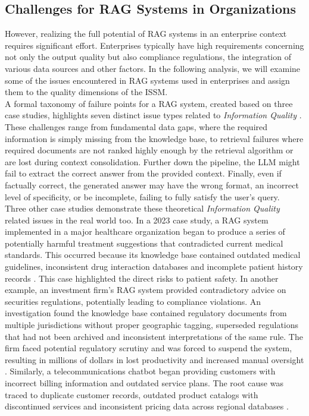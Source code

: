 \documentclass[
	english,
	ruledheaders=section,%
	class=report,%
	thesis={type=bachelor},%
	accentcolor=1b,%
	custommargins=true,%
	marginpar=false,%
	parskip=half-,%
	fontsize=11pt,%
	DIV=14,
]{tudapub}
\begin{document}
\subsection{Challenges for RAG Systems in Organizations}
However, realizing the full potential of RAG systems in an enterprise context requires significant effort. Enterprises typically have high requirements concerning not only the output quality but also compliance regulations, the integration of various data sources and other factors. In the following analysis, we will examine some of the issues encountered in RAG systems used in enterprises and assign them to the quality dimensions of the ISSM. \\
A formal taxonomy of failure points for a RAG system, created based on three case studies, highlights seven distinct issue types related to \textit{Information Quality} \parencite[p.~91]{Barnett2024}. These challenges range from fundamental data gaps, where the required information is simply missing from the knowledge base, to retrieval failures where required documents are not ranked highly enough by the retrieval algorithm or are lost during context consolidation. Further down the pipeline, the LLM might fail to extract the correct answer from the provided context. Finally, even if factually correct, the generated answer may have the wrong format, an incorrect level of specificity, or be incomplete, failing to fully satisfy the user's query.\\
Three other case studies demonstrate these theoretical \textit{Information Quality} related issues in the real world too. In a 2023 case study, a RAG system implemented in a major healthcare organization began to produce a series of potentially harmful treatment suggestions that contradicted current medical standards. This occurred because its knowledge base contained outdated medical guidelines, inconsistent drug interaction databases and incomplete patient history records \parencite{NStarX_Inc_2025}. This case highlighted the direct risks to patient safety. In another example, an investment firm's RAG system provided contradictory advice on securities regulations, potentially leading to compliance violations. An investigation found the knowledge base contained regulatory documents from multiple jurisdictions without proper geographic tagging, superseded regulations that had not been archived and inconsistent interpretations of the same rule. The firm faced potential regulatory scrutiny and was forced to suspend the system, resulting in millions of dollars in lost productivity and increased manual oversight \parencite{NStarX_Inc_2025}. Similarly, a telecommunications chatbot began providing customers with incorrect billing information and outdated service plans. The root cause was traced to duplicate customer records, outdated product catalogs with discontinued services and inconsistent pricing data across regional databases \parencite{NStarX_Inc_2025}.\\
\end{document}

